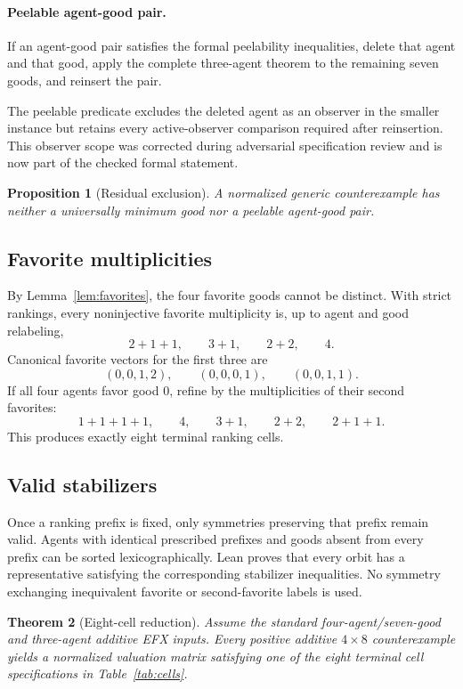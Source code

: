 \documentclass[11pt]{article}
\newtheorem{theorem}{Theorem}[section]
\newtheorem{proposition}[theorem]{Proposition}
\theoremstyle{definition}
\begin{document}
\paragraph{Peelable agent-good pair.}
If an agent-good pair satisfies the formal peelability inequalities, delete
that agent and that good, apply the complete three-agent theorem to the
remaining seven goods, and reinsert the pair.

The peelable predicate excludes the deleted agent as an observer in the
smaller instance but retains every active-observer comparison required after
reinsertion. This observer scope was corrected during adversarial
specification review and is now part of the checked formal statement.

\begin{proposition}[Residual exclusion]\label{prop:residual}
A normalized generic counterexample has neither a universally minimum good
nor a peelable agent-good pair.
\end{proposition}

\subsection{Favorite multiplicities}

By Lemma~\ref{lem:favorites}, the four favorite goods cannot be distinct.
With strict rankings, every noninjective favorite multiplicity is, up to
agent and good relabeling,
\[
  2+1+1,\qquad3+1,\qquad2+2,\qquad4.
\]
Canonical favorite vectors for the first three are
\[
  (0,0,1,2),\qquad(0,0,0,1),\qquad(0,0,1,1).
\]
If all four agents favor good $0$, refine by the multiplicities of their
second favorites:
\[
  1+1+1+1,\qquad4,\qquad3+1,\qquad2+2,\qquad2+1+1.
\]
This produces exactly eight terminal ranking cells.

\subsection{Valid stabilizers}

Once a ranking prefix is fixed, only symmetries preserving that prefix
remain valid. Agents with identical prescribed prefixes and goods absent from
every prefix can be sorted lexicographically. Lean proves that every orbit
has a representative satisfying the corresponding stabilizer inequalities.
No symmetry exchanging inequivalent favorite or second-favorite labels is
used.

\begin{theorem}[Eight-cell reduction]\label{thm:eightcells}
Assume the standard four-agent/seven-good and three-agent additive EFX
inputs. Every positive additive $4\times8$ counterexample yields a normalized
valuation matrix satisfying one of the eight terminal cell specifications in
Table~\ref{tab:cells}.
\end{theorem}
\end{document}
